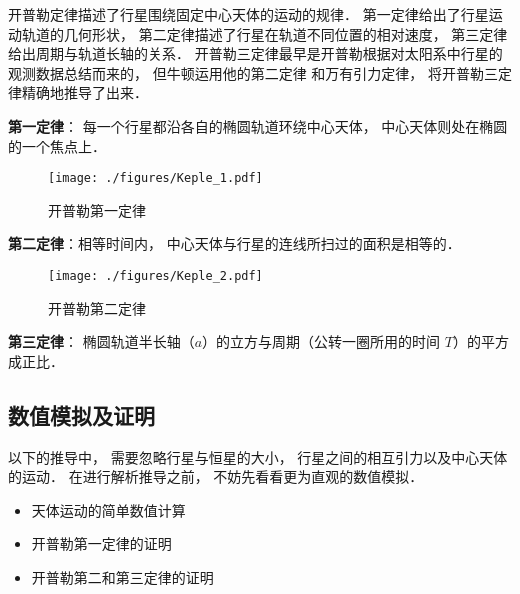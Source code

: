 

开普勒定律描述了行星围绕固定中心天体的运动的规律． 第一定律给出了行星运动轨道的几何形状， 第二定律描述了行星在轨道不同位置的相对速度， 第三定律给出周期与轨道长轴的关系． 开普勒三定律最早是开普勒根据对太阳系中行星的观测数据总结而来的， 但牛顿运用他的第二定律 和万有引力定律， 将开普勒三定律精确地推导了出来．

\textbf{第一定律}： 每一个行星都沿各自的椭圆轨道环绕中心天体， 中心天体则处在椭圆的一个焦点上．
\begin{figure}[ht]
\centering
\texttt{[image: ./figures/Keple\_1.pdf]}
\caption{开普勒第一定律} \label{Keple_fig1}
\end{figure}

\textbf{第二定律}：相等时间内， 中心天体与行星的连线所扫过的面积是相等的．
\begin{figure}[ht]
\centering
\texttt{[image: ./figures/Keple\_2.pdf]}
\caption{开普勒第二定律} \label{Keple_fig2}
\end{figure}

\textbf{第三定律}： 椭圆轨道半长轴（$a$）的立方与周期（公转一圈所用的时间 $T$）的平方成正比．

\subsection{数值模拟及证明}

以下的推导中， 需要忽略行星与恒星的大小， 行星之间的相互引力以及中心天体的运动． 在进行解析推导之前， 不妨先看看更为直观的数值模拟．
 
\begin{itemize}
\item 天体运动的简单数值计算
\item 开普勒第一定律的证明
\item 开普勒第二和第三定律的证明
\end{itemize}
 
